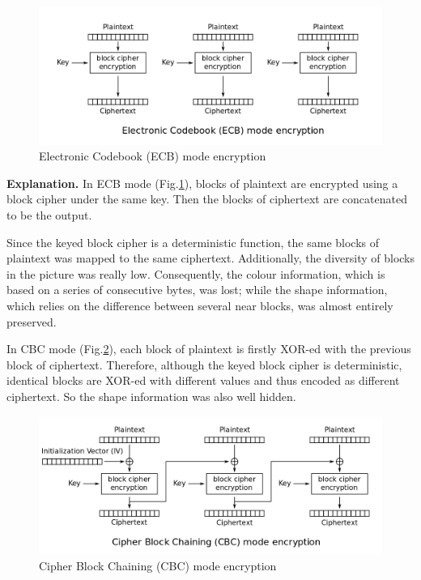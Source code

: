 \begin{figure}[ht!]
\centering
\includegraphics[width=\columnwidth]{pictures/ECB_encryption.png}
\caption{
    Electronic Codebook (ECB) mode encryption \protect\footnotemark
}
\label{fig:ECB_encryption}
\end{figure}


\textbf{Explanation.}
In ECB mode (Fig.\ref{fig:ECB_encryption}), blocks of plaintext are encrypted using a block cipher under the same key. 
Then the blocks of ciphertext are concatenated to be the output.

Since the keyed block cipher is a deterministic function, the same blocks of plaintext was mapped to the same ciphertext.
Additionally, the diversity of blocks in the picture was really low.
Consequently, the colour information, which is based on a series of consecutive bytes, was lost; while the shape information, which relies on the difference between several near blocks, was almost entirely preserved. 

In CBC mode (Fig.\ref{fig:CBC_encryption}), each block of plaintext is firstly XOR-ed with the previous block of ciphertext. Therefore, although the keyed block cipher is deterministic, identical blocks are XOR-ed with different values and thus encoded as different ciphertext. So the shape information was also well hidden. 

\begin{figure}[ht!]
\centering
\includegraphics[width=\columnwidth]{pictures/CBC_encryption.png}
\caption{
    Cipher Block Chaining (CBC) mode encryption
}
\label{fig:CBC_encryption}
\end{figure}

